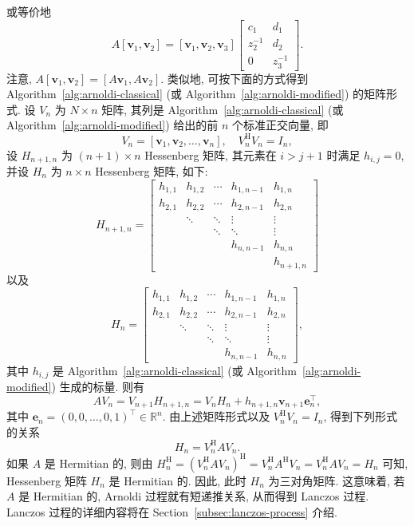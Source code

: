{或等价地}
\[
A[\bm v_1,\bm v_2]=[\bm v_1,\bm v_2,\bm v_3]
\begin{bmatrix}c_1&d_1\\z_2^{-1}&d_2\\0&z_3^{-1}\end{bmatrix}.
\]
{注意, $A[\bm v_1,\bm v_2]=[A\bm v_1,A\bm v_2]$. 类似地, 可按下面的方式得到 Algorithm~\ref{alg:arnoldi-classical} (或 Algorithm~\ref{alg:arnoldi-modified}) 的矩阵形式.}
{设 $V_n$ 为 $N\times n$ 矩阵, 其列是 Algorithm~\ref{alg:arnoldi-classical} (或 Algorithm~\ref{alg:arnoldi-modified}) 给出的前 $n$ 个标准正交向量, 即}
\[V_n=[\bm v_1,\bm v_2,\ldots,\bm v_n],\quad V_n^{\mathrm H}V_n=I_n,\]
{设 $H_{n+1,n}$ 为 $(n+1)\times n$ Hessenberg 矩阵, 其元素在 $i>j+1$ 时满足 $h_{i,j}=0$, 并设 $H_n$ 为 $n\times n$ Hessenberg 矩阵, 如下:}
\[
H_{n+1,n}=\begin{bmatrix}
h_{1,1}&h_{1,2}&\cdots&h_{1,n-1}&h_{1,n}\\
h_{2,1}&h_{2,2}&\cdots&h_{2,n-1}&h_{2,n}\\
&\ddots&\ddots&\vdots&\vdots\\
&&\ddots&\ddots&\vdots\\
&&&h_{n,n-1}&h_{n,n}\\
&&&&h_{n+1,n}
\end{bmatrix}
\]
{以及}
\[
H_n=\begin{bmatrix}
h_{1,1}&h_{1,2}&\cdots&h_{1,n-1}&h_{1,n}\\
h_{2,1}&h_{2,2}&\cdots&h_{2,n-1}&h_{2,n}\\
&\ddots&\ddots&\vdots&\vdots\\
&&\ddots&\ddots&\vdots\\
&&&h_{n,n-1}&h_{n,n}
\end{bmatrix},
\]
{其中 $h_{i,j}$ 是 Algorithm~\ref{alg:arnoldi-classical} (或 Algorithm~\ref{alg:arnoldi-modified}) 生成的标量. 则有}
\begin{equation}\label{eq:arnoldi-matrix-relation}
AV_n=V_{n+1}H_{n+1,n}=V_nH_n+h_{n+1,n}\bm v_{n+1}\bm e_n^\top,
\end{equation}
{其中 $\bm e_n=(0,0,\ldots,0,1)^\top\in\mathbb R^n$. 由上述矩阵形式以及 $V_n^{\mathrm H}V_n=I_n$, 得到下列形式的关系}
\begin{equation}\label{eq:arnoldi-projected-matrix}H_n=V_n^{\mathrm H}AV_n.\end{equation}
{如果 $A$ 是 Hermitian 的, 则由 $H_n^{\mathrm H}=(V_n^{\mathrm H}AV_n)^{\mathrm H}=V_n^{\mathrm H}A^{\mathrm H}V_n=V_n^{\mathrm H}AV_n=H_n$ 可知, Hessenberg 矩阵 $H_n$ 是 Hermitian 的. 因此, 此时 $H_n$ 为三对角矩阵. 这意味着, 若 $A$ 是 Hermitian 的, Arnoldi 过程就有短递推关系, 从而得到 Lanczos 过程. Lanczos 过程的详细内容将在 Section~\ref{subsec:lanczos-process} 介绍.}
